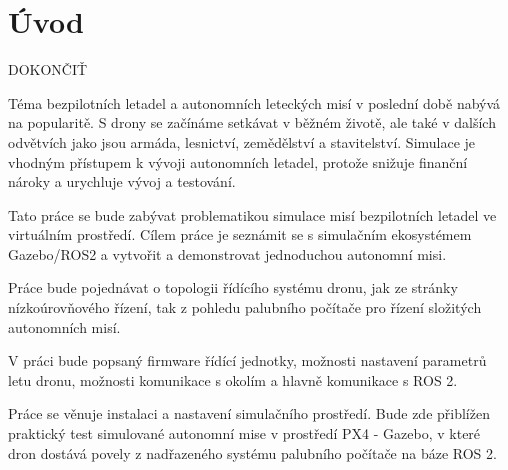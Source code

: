 \chapter*{Úvod}
{}

DOKONČIŤ

Téma bezpilotních letadel a autonomních leteckých misí v poslední době nabývá na popularitě. S drony se začínáme setkávat v běžném životě, ale také v dalších odvětvích jako jsou armáda, lesnictví, zemědělství a stavitelství. Simulace je vhodným přístupem k vývoji autonomních letadel, protože snižuje finanční nároky a urychluje vývoj a testování.

Tato práce se bude zabývat problematikou simulace misí bezpilotních letadel ve virtuálním prostředí. Cílem práce je seznámit se s simulačním ekosystémem Gazebo/ROS2 a vytvořit a demonstrovat jednoduchou autonomní misi.

Práce bude pojednávat o topologii řídícího systému dronu, jak ze stránky nízkoúrovňového řízení, tak z pohledu palubního počítače pro řízení složitých autonomních misí.

V práci bude popsaný firmware řídící jednotky, možnosti nastavení parametrů letu dronu, možnosti komunikace s okolím a hlavně komunikace s ROS 2.

Práce se věnuje instalaci a nastavení simulačního prostředí. Bude zde přiblížen praktický test simulované autonomní mise v prostředí PX4 - Gazebo, v které dron dostává povely z nadřazeného systému palubního počítače na báze ROS 2.